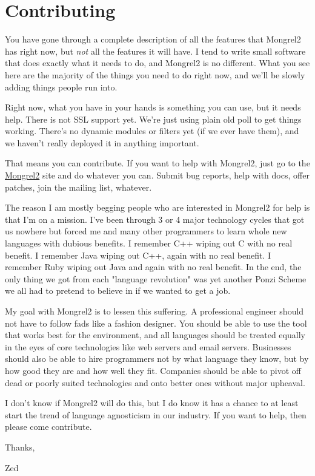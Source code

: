 \chapter{Contributing}

You have gone through a complete description of all the features that Mongrel2 has right now,
but \emph{not} all the features it will have.  I tend to write small software that does 
exactly what it needs to do, and Mongrel2 is no different.  What you see here are the 
majority of the things you need to do right now, and we'll be slowly adding things 
people run into.

Right now, what you have in your hands is something you can use, but it needs help.
There is not SSL support yet.  We're just using plain old poll to get things working.
There's no dynamic modules or filters yet (if we ever have them), and we haven't
really deployed it in anything important.

That means you can contribute.  If you want to help with Mongrel2, just go to 
the \href{http://mongrel2.org}{Mongrel2} site and do whatever you can.  Submit bug
reports, help with docs, offer patches, join the mailing list, whatever.

The reason I am mostly begging people who are interested in Mongrel2 for help is that I'm
on a mission.  I've been through 3 or 4 major technology cycles that got us nowhere
but forced me and many other programmers to learn whole new languages with dubious 
benefits.  I remember C++ wiping out C with no real benefit.  I remember Java wiping 
out C++, again with no real benefit.  I remember Ruby wiping out Java and again with no
real benefit.  In the end, the only thing we got from each "language revolution" was
yet another Ponzi Scheme we all had to pretend to believe in if we wanted to get a
job.

My goal with Mongrel2 is to lessen this suffering.  A professional engineer should not
have to follow fads like a fashion designer.  You should be able to use the tool that
works best for the environment, and all languages should be treated equally in the eyes
of core technologies like web servers and email servers.  Businesses should also be
able to hire programmers not by what language they know, but by how good they are and
how well they fit.  Companies should be able to pivot off dead or poorly suited
technologies and onto better ones without major upheaval.

I don't know if Mongrel2 will do this, but I do know it has a chance to at least start
the trend of language agnosticism in our industry.  If you want to help, then please
come contribute.

Thanks,

\indent Zed
